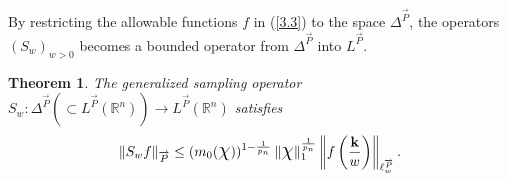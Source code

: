 \documentclass[11pt, a4paper]{article}
\newtheorem{thm}{Theorem}[section]
\theoremstyle{definition}
\numberwithin{equation}{section}
\def\RR{\mathbb R}
\def\Chi{\mbox{\Large$\chi$}}
\begin{document}
By restricting the allowable functions \( f \) in (\ref{3.3}) to the space \( \Delta^{\overrightarrow{P}} \), the operators \( (S_{w})_{w>0} \) becomes a bounded operator from \( \Delta^{\overrightarrow{P}}  \) into \( L^{\overrightarrow{P}} \).

\begin{thm} \label{interpol}
    The generalized sampling operator $S_{w}:\Delta^{\overrightarrow{P}} \left(\subset  L^{\overrightarrow{P}}(\RR^{n})\right)\rightarrow L^{\overrightarrow{P}}(\RR^{n}) $ satisfies
    \begin{equation*}
		\|S_{w}f\|_{\overrightarrow P}\leq (m_0(\Chi))^{1-\frac{1}{p_n}}\hspace{2pt} \|\Chi\|_1^{\frac{1}{p_{n}}} \left\|f \left( \frac{\textbf{k}}{w}\right) \right\|_{\ell^{\overrightarrow P}_w}.
    \end{equation*}
\end{thm}
\end{document}
